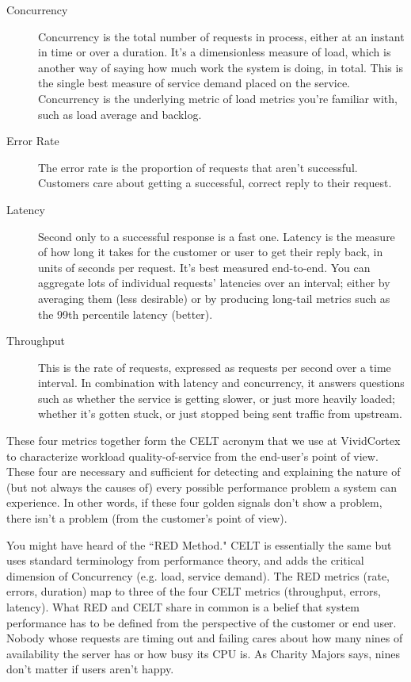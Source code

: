\documentclass{vivid_layout}
\begin{document}
\begin{description}
	\item[Concurrency] Concurrency is the total number of requests in process, either at an instant in time or over a duration. It's a dimensionless measure of load, which is another way of saying how much work the system is doing, in total. This is the single best measure of service demand placed on the service. Concurrency is the underlying metric of load metrics you're familiar with, such as load average and backlog.
	\item[Error Rate] The error rate is the proportion of requests that aren't successful. Customers care about getting a successful, correct reply to their request.
	\item[Latency] Second only to a successful response is a fast one. Latency is the measure of how long it takes for the customer or user to get their reply back, in units of seconds per request. It's best measured end-to-end. You can aggregate lots of individual requests' latencies over an interval; either by averaging them (less desirable) or by producing long-tail metrics such as the 99th percentile latency (better).
	\item[Throughput] This is the rate of requests, expressed as requests per second over a time interval. In combination with latency and concurrency, it answers questions such as whether the service is getting slower, or just more heavily loaded; whether it's gotten stuck, or just stopped being sent traffic from upstream.
\end{description}

These four metrics together form the CELT acronym that we use at VividCortex to characterize workload quality-of-service from the end-user's point of view. These four are necessary and sufficient for detecting and explaining the nature of (but not always the causes of) every possible performance problem a system can experience. In other words, if these four golden signals don't show a problem, there isn't a problem (from the customer's point of view).

You might have heard of the ``RED Method." CELT is essentially the same but uses standard terminology from performance theory, and adds the critical dimension of Concurrency (e.g. load, service demand). The RED metrics (rate, errors, duration) map to three of the four CELT metrics (throughput, errors, latency). What RED and CELT share in common is a belief that system performance has to be defined from the perspective of the customer or end user. Nobody whose requests are timing out and failing cares about how many nines of availability the server has or how busy its CPU is. As Charity Majors says, nines don't matter if users aren't happy.
\end{document}

